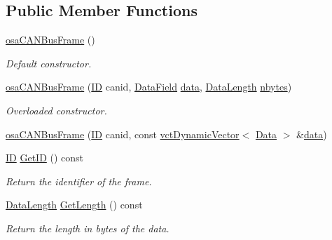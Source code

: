 \subsection*{Public Member Functions}
\begin{DoxyCompactItemize}
\item 
\hyperlink{classosa_c_a_n_bus_frame_a2615199c847dd3ed03b7414c5c1c473d}{osa\-C\-A\-N\-Bus\-Frame} ()
\begin{DoxyCompactList}\small\item\em Default constructor. \end{DoxyCompactList}\item 
\hyperlink{classosa_c_a_n_bus_frame_a76d0e5885c53c1730b387315b2dd9d3c}{osa\-C\-A\-N\-Bus\-Frame} (\hyperlink{classosa_c_a_n_bus_frame_ae917bcfe6427b2055a405716909c6048}{I\-D} canid, \hyperlink{classosa_c_a_n_bus_frame_ac41162892eefb85a1308d485ec630969}{Data\-Field} \hyperlink{classosa_c_a_n_bus_frame_ae5114021468fe3ca35f95ec123db1e2d}{data}, \hyperlink{classosa_c_a_n_bus_frame_ab5bacbd4959a9046925438af889744f4}{Data\-Length} \hyperlink{classosa_c_a_n_bus_frame_abc694b0742e9c5b7e2db8640caa17565}{nbytes})
\begin{DoxyCompactList}\small\item\em Overloaded constructor. \end{DoxyCompactList}\item 
\hyperlink{classosa_c_a_n_bus_frame_a93601457f3b5e4254a3ed9b11d790f1d}{osa\-C\-A\-N\-Bus\-Frame} (\hyperlink{classosa_c_a_n_bus_frame_ae917bcfe6427b2055a405716909c6048}{I\-D} canid, const \hyperlink{classvct_dynamic_vector}{vct\-Dynamic\-Vector}$<$ \hyperlink{classosa_c_a_n_bus_frame_a938f540c9de33b240d3bc4f21c341ba5}{Data} $>$ \&\hyperlink{classosa_c_a_n_bus_frame_ae5114021468fe3ca35f95ec123db1e2d}{data})
\item 
\hyperlink{classosa_c_a_n_bus_frame_ae917bcfe6427b2055a405716909c6048}{I\-D} \hyperlink{classosa_c_a_n_bus_frame_ab70017817004bc49297fbc303a5a0919}{Get\-I\-D} () const 
\begin{DoxyCompactList}\small\item\em Return the identifier of the frame. \end{DoxyCompactList}\item 
\hyperlink{classosa_c_a_n_bus_frame_ab5bacbd4959a9046925438af889744f4}{Data\-Length} \hyperlink{classosa_c_a_n_bus_frame_a4dac9f774e50ee0396481400d0179768}{Get\-Length} () const 
\begin{DoxyCompactList}\small\item\em Return the length in bytes of the data. \end{DoxyCompactList}\item 

\end{DoxyCompactItemize}
